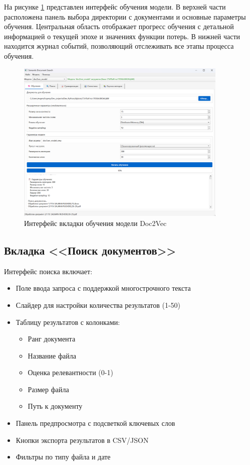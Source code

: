 На рисунке \ref{obuchenie} представлен интерфейс обучения модели. В верхней части расположена панель выбора директории с документами и основные параметры обучения. Центральная область отображает прогресс обучения с детальной информацией о текущей эпохе и значениях функции потерь. В нижней части находится журнал событий, позволяющий отслеживать все этапы процесса обучения.
\begin{figure}[H]
	\centering
	\includegraphics[width=0.9\textwidth]{images/obuchenie.png}
	\caption{Интерфейс вкладки обучения модели Doc2Vec}
	\label{obuchenie}
\end{figure}



\subsection{Вкладка <<Поиск документов>>}

Интерфейс поиска включает:
\begin{itemize}
	\item Поле ввода запроса с поддержкой многострочного текста
	\item Слайдер для настройки количества результатов (1-50)
	\item Таблицу результатов с колонками:
	\begin{itemize}
		\item Ранг документа
		\item Название файла
		\item Оценка релевантности (0-1)
		\item Размер файла
		\item Путь к документу
	\end{itemize}
	\item Панель предпросмотра с подсветкой ключевых слов
	\item Кнопки экспорта результатов в CSV/JSON
	\item Фильтры по типу файла и дате
\end{itemize}

